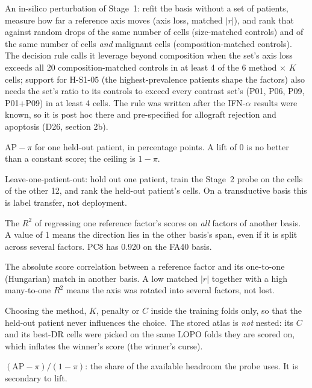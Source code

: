 \begin{description}[leftmargin=0pt,itemsep=3pt,font=\normalfont\bfseries]
\item[Leverage test.] An in-silico perturbation of Stage~1: refit the basis without a set of patients, measure how far a reference axis moves (axis loss, matched $|r|$), and rank that against random drops of the same number of cells (size-matched controls) and of the same number of cells \emph{and} malignant cells (composition-matched controls). The decision rule calls it leverage beyond composition when the set's axis loss exceeds all 20 composition-matched controls in at least 4 of the 6 method $\times$ $K$ cells; support for H-S1-05 (the highest-prevalence patients shape the factors) also needs the set's ratio to its controls to exceed every contrast set's (P01, P06, P09, P01+P09) in at least 4 cells. The rule was written after the IFN-$\alpha$ results were known, so it is post hoc there and pre-specified for allograft rejection and apoptosis (D26, section 2b).

\item[Lift.] $\mathrm{AP}-\pi$ for one held-out patient, in percentage points. A lift of 0 is no better than a constant score; the ceiling is $1-\pi$.

\item[LOPO.] Leave-one-patient-out: hold out one patient, train the Stage~2 probe on the cells of the other 12, and rank the held-out patient's cells. On a transductive basis this is label transfer, not deployment.

\item[Many-to-one $R^2$.] The $R^2$ of regressing one reference factor's scores on \emph{all} factors of another basis. A value of 1 means the direction lies in the other basis's span, even if it is split across several factors. PC8 has 0.920 on the FA40 basis.

\item[Matched $|r|$.] The absolute score correlation between a reference factor and its one-to-one (Hungarian) match in another basis. A low matched $|r|$ together with a high many-to-one $R^2$ means the axis was rotated into several factors, not lost.

\item[Nested selection.] Choosing the method, $K$, penalty or $C$ inside the training folds only, so that the held-out patient never influences the choice. The stored atlas is \emph{not} nested: its $C$ and its best-DR cells were picked on the same LOPO folds they are scored on, which inflates the winner's score (the winner's curse).

\item[Normalized lift.] $(\mathrm{AP}-\pi)/(1-\pi)$: the share of the available headroom the probe uses. It is secondary to lift.


\end{description}
